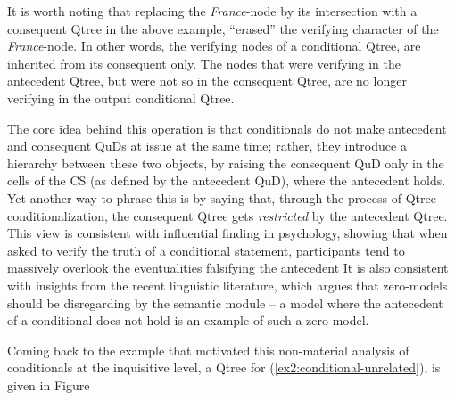 It is worth noting that replacing the \textit{France}-node by its intersection with a consequent Qtree in the above example, ``erased'' the verifying character of the \textit{France}-node. In other words, the verifying nodes of a conditional Qtree, are inherited from its consequent only. The nodes that were verifying in the antecedent Qtree, but were not so in the consequent Qtree, are no longer verifying in the output conditional Qtree.

The core idea behind this operation is that conditionals do not make antecedent and consequent QuDs at issue at the same time; rather, they introduce a hierarchy between these two objects, by raising the consequent QuD only in the cells of the CS (as defined by the antecedent QuD), where the antecedent holds. Yet another way to phrase this is by saying that, through the process of Qtree-conditionalization, the consequent Qtree gets \textit{restricted} by the antecedent Qtree. This view is consistent with influential finding in psychology, showing that when asked to verify the truth of a conditional statement, participants tend to massively overlook the eventualities falsifying the antecedent \parencite{Wason1968} It is also consistent with insights from the recent linguistic literature, which argues that zero-models should be disregarding by the semantic module \parencite{Aloni2022} -- a model where the antecedent of a conditional does not hold is an example of such a zero-model.

Coming back to the example that motivated this non-material analysis of conditionals at the inquisitive level, a Qtree for (\ref{ex2:conditional-unrelated}), is given in Figure

